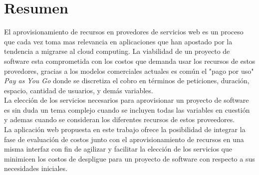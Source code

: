



\begingroup
\let\clearpage\relax
\let\cleardoublepage\relax
\let\cleardoublepage\relax

\chapter*{Resumen}
El aprovisionamiento de recursos en provedores de servicios web es un proceso que cada vez toma mas relevancia en aplicaciones que han apostado por la tendencia a migrarse al cloud computing. La viabilidad de un proyecto de software esta comprometida con los costos que demanda usar los recursos de estos provedores, gracias a los modelos comerciales actuales es común el "pago por uso" \textit{Pay as You Go} donde se discretiza el cobro en términos de peticiones, duración, espacio, cantidad de usuarios, y demás variables. \\

La elección de los servicios necesarios para aprovisionar un proyecto de software es sin duda un tema complejo cuando se incluyen todas las variables en cuestión y ademas cuando se consideran los diferentes recursos de estos proveedores. \\

La aplicación web propuesta en este trabajo ofrece la posibilidad de integrar la fase de evaluación de costos junto con el aprovisionamiento de recursos en una misma interfaz con fin de agilizar y facilitar la elección de los servicios que minimicen los costos de despligue para un proyecto de software con respecto a sus necesidades iniciales.

\endgroup			

\vfill